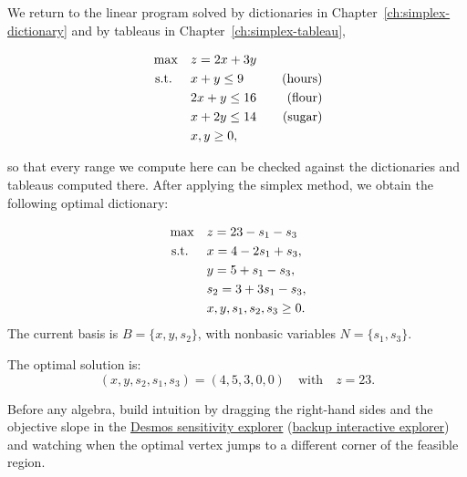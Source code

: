 We return to the linear program solved by dictionaries in Chapter~\ref{ch:simplex-dictionary} and by tableaus in Chapter~\ref{ch:simplex-tableau},
\begin{tcolorbox}[colback=algslate!6, colframe=algslate, coltitle=white, fonttitle=\bfseries, sharp corners,
    title=\textbf{Running Example}]
\[
\begin{aligned}
\max \quad & z = 2x + 3y \\
\mbox{ s.t. } \quad
& x + y \leq 9 \quad & \mbox{(hours)} \\
& 2x + y \leq 16 \quad & \mbox{(flour)} \\
& x + 2y \leq 14 \quad & \mbox{(sugar)} \\
& x, y \geq 0,
\end{aligned}
\]
\end{tcolorbox}
\noindent so that every range we compute here can be checked against the dictionaries and tableaus computed there. After applying the simplex method, we obtain the following optimal dictionary:

\begin{tcolorbox}[colback=algopt!6, colframe=algopt, coltitle=white, fonttitle=\bfseries, sharp corners,
    title=\textbf{Final Dictionary}]
\[
\begin{aligned}
\max \quad
& z = 23 - s_1 - s_3 \\
\mbox{ s.t. } \quad
& x = 4 - 2s_1 + s_3, \\
& y = 5 + s_1 - s_3, \\
& s_2 = 3 + 3s_1 - s_3, \\
& x, y, s_1, s_2, s_3 \geq 0.
\end{aligned}
\]
The current basis is \( B = \{x, y, s_2\} \), with nonbasic variables \( N = \{s_1, s_3\} \).

The optimal solution is:
\[
(x, y, s_2, s_1, s_3) = (4, 5, 3, 0, 0) \quad \text{with} \quad z = 23.
\]
\end{tcolorbox}

\begin{tcolorbox}[colback=sensbox!6, colframe=sensbox, coltitle=white, fonttitle=\bfseries, sharp corners,
    title={\ding{228}\ Interactive: drag the constraints}]
Before any algebra, build intuition by dragging the right-hand sides and the objective slope in the \href{https://www.desmos.com/calculator/xz1f0tdjf9}{Desmos sensitivity explorer} (\href{https://open-optimization.github.io/open-optimization-or-book/interactive-figures/lp-sensitivity-explorer.html}{backup interactive explorer}) and watching when the optimal vertex jumps to a different corner of the feasible region.
\end{tcolorbox}

